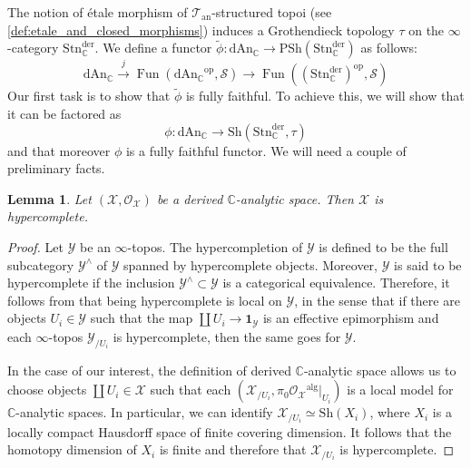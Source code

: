 \documentclass[12pt,a4paper,reqno]{amsart}
\theoremstyle{plain}
\newtheorem{lem}[thm]{Lemma}
\theoremstyle{definition}
\theoremstyle{remark}
\numberwithin{equation}{section}
\begin{document}
The notion of \'etale morphism of ${{\mathcal T}_{\mathrm{an}}}$-structured topoi (see \cref{def:etale_and_closed_morphisms}) induces a Grothendieck topology $\tau$ on the $\infty$-category ${\mathrm{Stn}^{\mathrm{der}}_{\mathbb C}}$.
We define a functor $\widetilde{\phi} \colon {\mathrm{dAn}_{\mathbb C}} \to {\mathrm{PSh}}({\mathrm{Stn}^{\mathrm{der}}_{\mathbb C}})$ as follows:
\[ {\mathrm{dAn}_{\mathbb C}} \xrightarrow{j} \operatorname{Fun}({\mathrm{dAn}_{\mathbb C}}^{\mathrm{op}}, {\mathcal S}) \to \operatorname{Fun}(({\mathrm{Stn}^{\mathrm{der}}_{\mathbb C}})^{\mathrm{op}}, {\mathcal S}) \]
Our first task is to show that $\widetilde{\phi}$ is fully faithful.
To achieve this, we will show that it can be factored as
\[ \phi \colon {\mathrm{dAn}_{\mathbb C}} \to {\mathrm{Sh}}({\mathrm{Stn}^{\mathrm{der}}_{\mathbb C}}, \tau) \]
and that moreover $\phi$ is a fully faithful functor.
We will need a couple of preliminary facts.

\begin{lem} \label{lem:derived_canal_spaces_hypercomplete}
	Let $({\mathcal X}, {\mathcal O}_{\mathcal X})$ be a derived {$\mathbb C$-analytic\xspace} space.
	Then ${\mathcal X}$ is hypercomplete.
\end{lem}

\begin{proof}
	Let ${\mathcal Y}$ be an $\infty$-topos. The hypercompletion of ${\mathcal Y}$ is defined to be the full subcategory ${\mathcal Y}^{\wedge}$ of ${\mathcal Y}$ spanned by hypercomplete objects. Moreover, ${\mathcal Y}$ is said to be hypercomplete if the inclusion ${\mathcal Y}^\wedge \subset {\mathcal Y}$ is a categorical equivalence.
	Therefore, it follows from \cite[6.5.2.21 6.5.2.22]{HTT} that being hypercomplete is local on ${\mathcal Y}$, in the sense that if there are objects $U_i \in {\mathcal Y}$ such that the map $\coprod U_i \to \mathbf 1_{\mathcal Y}$ is an effective epimorphism and each $\infty$-topos ${\mathcal Y}_{/U_i}$ is hypercomplete, then the same goes for ${\mathcal Y}$.
	
	In the case of our interest, the definition of derived {$\mathbb C$-analytic\xspace} space allows us to choose objects $\coprod U_i \in {\mathcal X}$ such that each $({\mathcal X}_{/U_i}, \pi_0 {\mathcal O}_{\mathcal X}{^\mathrm{alg}}|_{U_i})$ is a local model for {$\mathbb C$-analytic\xspace} spaces.
	In particular, we can identify ${\mathcal X}_{/U_i} \simeq {\mathrm{Sh}}(X_i)$, where $X_i$ is a locally compact Hausdorff space of finite covering dimension.
	It follows that the homotopy dimension of $X_i$ is finite and therefore that ${\mathcal X}_{/U_i}$ is hypercomplete.
\end{proof}
\end{document}
